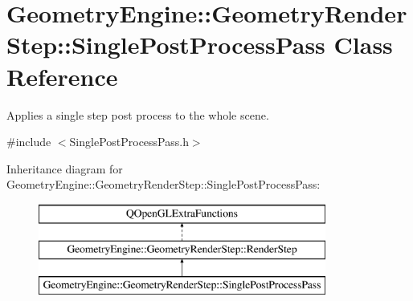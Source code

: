 \hypertarget{class_geometry_engine_1_1_geometry_render_step_1_1_single_post_process_pass}{}\section{Geometry\+Engine\+::Geometry\+Render\+Step\+::Single\+Post\+Process\+Pass Class Reference}
\label{class_geometry_engine_1_1_geometry_render_step_1_1_single_post_process_pass}


Applies a single step post process to the whole scene.  




{\ttfamily \#include $<$Single\+Post\+Process\+Pass.\+h$>$}

Inheritance diagram for Geometry\+Engine\+::Geometry\+Render\+Step\+::Single\+Post\+Process\+Pass\+:\begin{figure}[H]
\begin{center}
\leavevmode
\includegraphics[height=3.000000cm]{class_geometry_engine_1_1_geometry_render_step_1_1_single_post_process_pass}
\end{center}
\end{figure}
